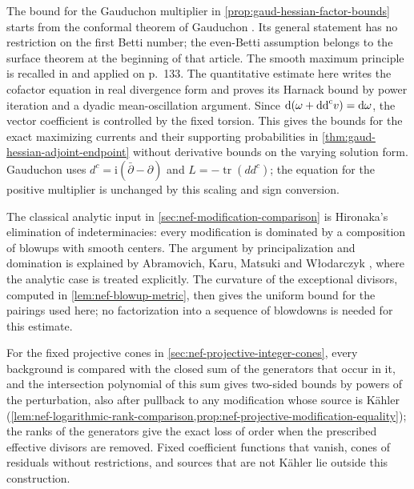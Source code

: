 The bound for the Gauduchon multiplier in \cref{prop:gaud-hessian-factor-bounds} starts from the conformal theorem of Gauduchon \cite[Th\'eor\`eme~2 and its proof, pp.~132--133]{GauduchonStandard85}. Its general statement has no restriction on the first Betti number; the even-Betti assumption belongs to the surface theorem at the beginning of that article. The smooth maximum principle is recalled in \cite[pp.~131--132]{GauduchonStandard85} and applied on p.~133. The quantitative estimate here writes the cofactor equation in real divergence form and proves its Harnack bound by power iteration and a dyadic mean-oscillation argument. Since $\mathrm d(\omega+\mathrm{dd}^{\mathrm{c}} v)=\mathrm d\omega$, the vector coefficient is controlled by the fixed torsion. This gives the bounds for the exact maximizing currents and their supporting probabilities in \cref{thm:gaud-hessian-adjoint-endpoint} without derivative bounds on the varying solution form. Gauduchon uses $d^c=\mathrm i(\bar\partial-\partial)$ and $L=-\operatorname{tr}(dd^c)$; the equation for the positive multiplier is unchanged by this scaling and sign conversion.

The classical analytic input in \cref{sec:nef-modification-comparison} is Hironaka's elimination of indeterminacies: every modification is dominated by a composition of blowups with smooth centers. The argument by principalization and domination is explained by Abramovich, Karu, Matsuki and W{\l}odarczyk \cite[Sections 1.2.3--1.2.4, pp.~538--539, and Section 5.4, p.~564]{AKMW02}, where the analytic case is treated explicitly. The curvature of the exceptional divisors, computed in \cref{lem:nef-blowup-metric}, then gives the uniform bound for the pairings used here; no factorization into a sequence of blowdowns is needed for this estimate.

For the fixed projective cones in \cref{sec:nef-projective-integer-cones}, every background is compared with the closed sum of the generators that occur in it, and the intersection polynomial of this sum gives two-sided bounds by powers of the perturbation, also after pullback to any modification whose source is K\"ahler (\cref{lem:nef-logarithmic-rank-comparison,prop:nef-projective-modification-equality}); the ranks of the generators give the exact loss of order when the prescribed effective divisors are removed. Fixed coefficient functions that vanish, cones of residuals without restrictions, and sources that are not K\"ahler lie outside this construction.

